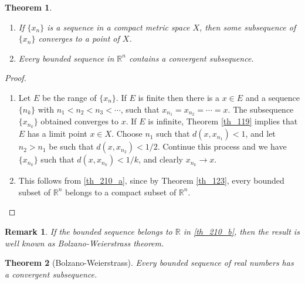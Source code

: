 \documentclass[10pt]{book}
\newtheorem{theorem}{Theorem}[chapter]
\newtheorem{remark}{Remark}[chapter]
\theoremstyle{definition}
\numberwithin{equation}{chapter}
\begin{document}
\begin{theorem}\label{th_210}
~\begin{enumerate}[label=(\alph*)]
    \item If $\{x_n\}$ is a sequence in a compact metric space $X$, then some subsequence of $\{x_n\}$ converges to a point of $X$. \label{th_210_a}
    
    \item Every bounded sequence in $\mathbb{R}^n$ contains a convergent subsequence. \label{th_210_b}
\end{enumerate}
\end{theorem}
\begin{proof}
~\begin{enumerate}[label=(\alph*)]
    \item Let $E$ be the range of $\{x_n\}$. If $E$ is finite then there is a $x \in E$ and a sequence $\{n_k\}$ with $n_1 < n_2 < n_3 < \cdots$, such that $x_{n_1} = x_{n_2} = \cdots = x$. The subsequence $\{x_{n_k}\}$ obtained converges to $x$. If $E$ is infinite, Theorem \ref{th_119} implies that $E$ has a limit point $x \in X$. Choose $n_1$ such that $d(x,x_{n_1}) < 1$, and let $n_2 > n_1$ be such that $d(x,x_{n_2}) < 1/2$. Continue this process and we have $\{x_{n_k}\}$ such that $d(x,x_{n_k}) < 1/k$, and clearly $x_{n_k} \to x$.
    
    \item This follows from \ref{th_210_a}, since by Theorem \ref{th_123}, every bounded subset of $\mathbb{R}^n$ belongs to a compact subset of $\mathbb{R}^n$.
\end{enumerate}
\end{proof}

\begin{remark}
If the bounded sequence belongs to $\mathbb{R}$ in \ref{th_210_b}, then the result is well known as Bolzano-Weierstrass theorem.
\end{remark}

\medskip

\begin{theorem}[Bolzano-Weierstrass]
Every bounded sequence of real numbers has a convergent subsequence.
\end{theorem}

\medskip
\end{document}
